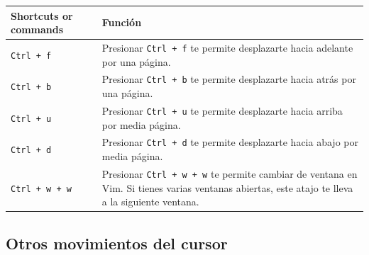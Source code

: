 \documentclass[
  doc,
  floatsintext,
  longtable,
  a4paper,
  nolmodern,
  notxfonts,
  notimes,
  12pt,
  colorlinks=true,linkcolor=blue,citecolor=blue,urlcolor=blue]{apa7}
\newcounter{none} %
\begin{document}
{\def\LTcaptype{none} %
\begin{longtable}[]{@{}
  >{\raggedright\arraybackslash}p{}
  >{\raggedright\arraybackslash}p{}@{}}
\toprule\noalign{}
\begin{minipage}[b]{\linewidth}\raggedright
Shortcuts or commands
\end{minipage} & \begin{minipage}[b]{\linewidth}\raggedright
Función
\end{minipage} \\
\midrule\noalign{}
\endhead
\bottomrule\noalign{}
\endlastfoot
\texttt{Ctrl\ +\ f} & Presionar \texttt{Ctrl\ +\ f} te permite
desplazarte hacia adelante por una página. \\
\texttt{Ctrl\ +\ b} & Presionar \texttt{Ctrl\ +\ b} te permite
desplazarte hacia atrás por una página. \\
\texttt{Ctrl\ +\ u} & Presionar \texttt{Ctrl\ +\ u} te permite
desplazarte hacia arriba por media página. \\
\texttt{Ctrl\ +\ d} & Presionar \texttt{Ctrl\ +\ d} te permite
desplazarte hacia abajo por media página. \\
\texttt{Ctrl\ +\ w\ +\ w} & Presionar \texttt{Ctrl\ +\ w\ +\ w} te
permite cambiar de ventana en Vim. Si tienes varias ventanas abiertas,
este atajo te lleva a la siguiente ventana. \\
\end{longtable}
}

\subsection{Otros movimientos del
cursor}\label{otros-movimientos-del-cursor}
\end{document}
